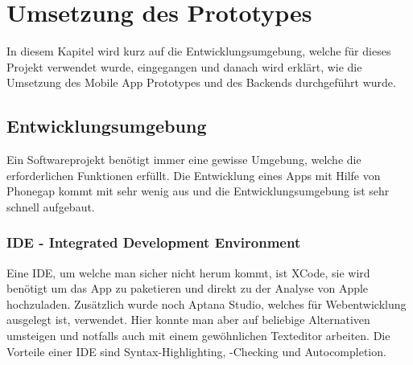 %
%

\chapter{Umsetzung des Prototypes}\label{chap.umsetzung}
In diesem Kapitel wird kurz auf die Entwicklungsumgebung, welche für dieses Projekt verwendet wurde, eingegangen und danach wird erklärt, wie die Umsetzung des Mobile App Prototypes und des Backends durchgeführt wurde.

\section{Entwicklungsumgebung}\label{entwicklungsumgebung}
Ein Softwareprojekt benötigt immer eine gewisse Umgebung, welche die erforderlichen Funktionen erfüllt. Die Entwicklung eines Apps mit Hilfe von Phonegap kommt mit sehr wenig aus und die Entwicklungsumgebung ist sehr schnell aufgebaut.

\subsection{IDE - Integrated Development Environment}
Eine IDE, um welche man sicher nicht herum kommt, ist XCode, sie wird benötigt um das App zu paketieren und direkt zu der Analyse von Apple hochzuladen. Zusätzlich wurde noch Aptana Studio, welches für Webentwicklung ausgelegt ist, verwendet. Hier konnte man aber auf beliebige Alternativen umsteigen und notfalls auch mit einem gewöhnlichen Texteditor arbeiten. Die Vorteile einer IDE sind Syntax-Highlighting, -Checking und Autocompletion.

